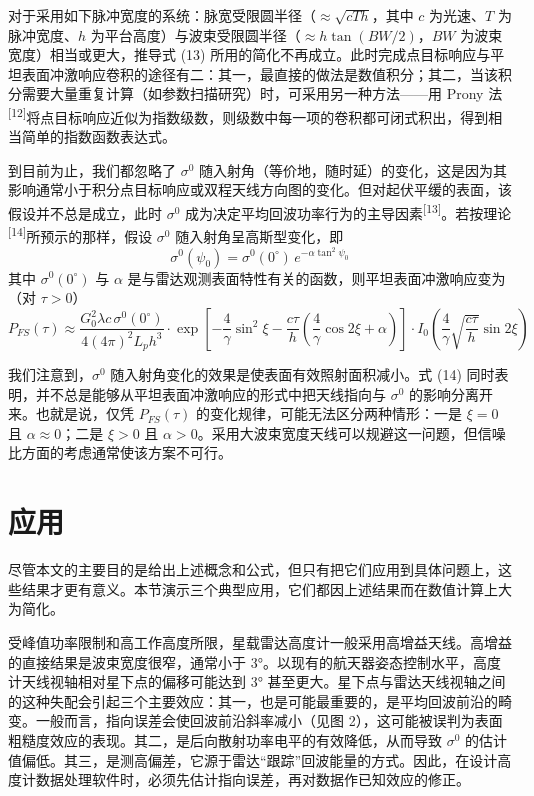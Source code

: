 对于采用如下脉冲宽度的系统：脉宽受限圆半径（$\approx\sqrt{cTh}$，其中 $c$ 为光速、$T$ 为脉冲宽度、$h$ 为平台高度）与波束受限圆半径（$\approx h\tan(BW/2)$，$BW$ 为波束宽度）相当或更大，推导式 (13) 所用的简化不再成立。此时完成点目标响应与平坦表面冲激响应卷积的途径有二：其一，最直接的做法是数值积分；其二，当该积分需要大量重复计算（如参数扫描研究）时，可采用另一种方法——用 Prony 法\textsuperscript{[12]}将点目标响应近似为指数级数，则级数中每一项的卷积都可闭式积出，得到相当简单的指数函数表达式。

到目前为止，我们都忽略了 $\sigma^{0}$ 随入射角（等价地，随时延）的变化，这是因为其影响通常小于积分点目标响应或双程天线方向图的变化。但对起伏平缓的表面，该假设并不总是成立，此时 $\sigma^{0}$ 成为决定平均回波功率行为的主导因素\textsuperscript{[13]}。若按理论\textsuperscript{[14]}所预示的那样，假设 $\sigma^{0}$ 随入射角呈高斯型变化，即
\[
\sigma^{0}(\psi_{0}) = \sigma^{0}(0^{\circ})\,e^{-\alpha\tan^{2}\psi_{0}}
\]
其中 $\sigma^{0}(0^{\circ})$ 与 $\alpha$ 是与雷达观测表面特性有关的函数，则平坦表面冲激响应变为（对 $\tau > 0$）
\[
P_{FS}(\tau) \approx \frac{G_{0}^{2}\lambda c\,\sigma^{0}(0^{\circ})}{4(4\pi)^{2}L_{p}h^{3}} \cdot \exp\left[-\frac{4}{\gamma}\sin^{2}\xi - \frac{c\tau}{h}\left(\frac{4}{\gamma}\cos 2\xi + \alpha\right)\right] \cdot I_{0}\!\left(\frac{4}{\gamma}\sqrt{\frac{c\tau}{h}}\sin 2\xi\right)
\tag{14}
\]

我们注意到，$\sigma^{0}$ 随入射角变化的效果是使表面有效照射面积减小。式 (14) 同时表明，并不总是能够从平坦表面冲激响应的形式中把天线指向与 $\sigma^{0}$ 的影响分离开来。也就是说，仅凭 $P_{FS}(\tau)$ 的变化规律，可能无法区分两种情形：一是 $\xi = 0$ 且 $\alpha \approx 0$；二是 $\xi > 0$ 且 $\alpha > 0$。采用大波束宽度天线可以规避这一问题，但信噪比方面的考虑通常使该方案不可行。

\section{应用}
\seccontent
尽管本文的主要目的是给出上述概念和公式，但只有把它们应用到具体问题上，这些结果才更有意义。本节演示三个典型应用，它们都因上述结果而在数值计算上大为简化。

受峰值功率限制和高工作高度所限，星载雷达高度计一般采用高增益天线。高增益的直接结果是波束宽度很窄，通常小于 3°。以现有的航天器姿态控制水平，高度计天线视轴相对星下点的偏移可能达到 3° 甚至更大。星下点与雷达天线视轴之间的这种失配会引起三个主要效应：其一，也是可能最重要的，是平均回波前沿的畸变。一般而言，指向误差会使回波前沿斜率减小（见图 2），这可能被误判为表面粗糙度效应的表现。其二，是后向散射功率电平的有效降低，从而导致 $\sigma^{0}$ 的估计值偏低。其三，是测高偏差，它源于雷达“跟踪”回波能量的方式。因此，在设计高度计数据处理软件时，必须先估计指向误差，再对数据作已知效应的修正。

